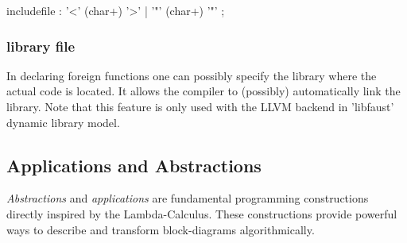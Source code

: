 \begin{rail}
includefile : '<' (char+) '>' | '"' (char+) '"' ;
\end{rail}

\subsubsection{library file}
In declaring foreign functions one can possibly specify the library where the actual code is located. It allows the \faust compiler to (possibly) automatically link the library. Note that this feature is only used with the LLVM backend in 'libfaust' dynamic library model.

%  









\subsection{Applications and Abstractions}

\textit{Abstractions} and \textit{applications} are fundamental programming constructions directly inspired by the Lambda-Calculus. These constructions provide powerful ways to describe and transform block-diagrams algorithmically.

